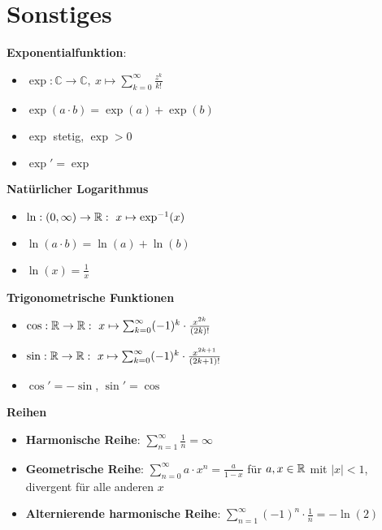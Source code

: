 \section{Sonstiges}


\textbf{Exponentialfunktion}:
\begin{itemize}
\item $\exp:\mathbb{C}\to\mathbb{C},\ x\mapsto\sum_{k=0}^\infty \frac{z^k}{k!}$

\item $\exp(a\cdot b)=\exp(a)+\exp(b)$

\item $\exp$ stetig, $\exp>0$

\item $\exp'=\exp$
\end{itemize}

\textbf{Natürlicher Logarithmus}
\begin{itemize}
\item $\ln: (0,\infty)\to\R:\ x\mapsto\exp^{-1}(x)$

\item $\ln(a\cdot b)=\ln(a)+\ln(b)$

\item $\ln(x)=\frac{1}{x}$
\end{itemize}

\textbf{Trigonometrische Funktionen}
\begin{itemize}
\item $\cos:\R\to\R:\ x\mapsto\sum_{k=0}^\infty (-1)^k\cdot\frac{x^{2k}}{(2k)!}$

\item $\sin:\R\to\R:\ x\mapsto\sum_{k=0}^\infty (-1)^k\cdot\frac{x^{2k+1}}{(2k+1)!}$

\item $\cos' = -\sin$, $\sin' = \cos$
\end{itemize}

\textbf{Reihen}
\begin{itemize}
\item \textbf{Harmonische Reihe}: $\sum_{n=1}^\infty \frac{1}{n}=\infty$

\item \textbf{Geometrische Reihe}: $\sum_{n=0}^\infty a\cdot x^n = \frac{a}{1-x}$
für $a,x\in\mathbb{R}$ mit $|x|<1$, divergent für alle anderen $x$

\item \textbf{Alternierende harmonische Reihe}:
$\sum_{n=1}^\infty (-1)^n\cdot\frac{1}{n}=-\ln(2)$
\end{itemize}